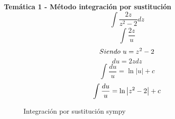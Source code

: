 

\textbf{Temática 1 - Método integración por sustitución}
\[\int \frac{2z}{z^2-2}dz\]
\[\int \frac{2z}{u}\]
\[Siendo \ u=z^2-2\]
\[du=2zdz\]
\[\int \frac{du}{u}=\ln \left|u\right|+c\]
\[\int \frac{du}{u}=\ln \left|z^2-2\right|+c\]

\begin{figure}[h]
    \begin{center}
        \caption{Integración por sustitución sympy}
    \end{center}
\end{figure}
